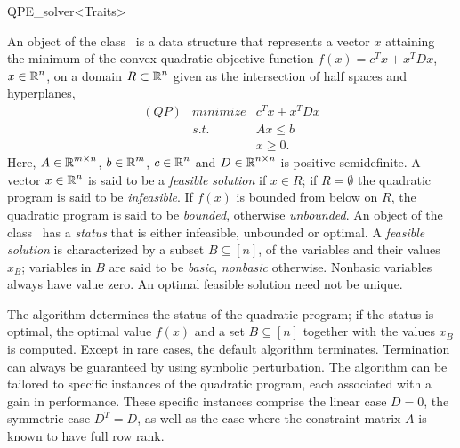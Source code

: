 
\begin{ccRefClass}{QPE_solver<Traits>}

\ccDefinition
An object of the class \ccRefName\ is a data structure that
represents a vector $x$ attaining the minimum of the convex quadratic objective
function $f(x)=c^{T}x+x^{T}Dx$, $x \in \mbox{$\mathbb R$}^{n}$, on a domain $R \subset \mbox{$\mathbb R$}^{n}$
given as the intersection of half spaces and hyperplanes,
\begin{eqnarray*}
(QP)&minimize & c^{T}x+x^{T}Dx \\
&s.t.     & Ax \leq b \\
&& x \geq 0.
\end{eqnarray*}
Here, $A \in \mbox{$\mathbb R$}^{m \times n}$, $b \in \mbox{$\mathbb R$}^{m}$, $c \in \mbox{$\mathbb R$}^{n}$ and
$D \in \mbox{$\mathbb R$}^{n \times n}$ is positive-semidefinite.
A vector $x \in \mbox{$\mathbb R$}^{n}$ is said to be a \emph{feasible solution}
if $x \in R$; if $R=\emptyset$ the quadratic program is said to be
\emph{infeasible}. If $f(x)$ is bounded from
below on $R$, the quadratic program is said to be \emph{bounded}, otherwise
\emph{unbounded}. An object of the class \ccRefName\ has a \emph{status} that
is either infeasible, unbounded or optimal.  
A \emph{feasible solution} is characterized by a
subset $B\subseteq\left[n\right]$, of the variables
and their values $x_{B}$;
variables in $B$ are said to be \emph{basic}, \emph{nonbasic} otherwise. 
Nonbasic variables always have value zero. An optimal feasible solution
need not be unique.

The algorithm determines the status of the quadratic program; if the status is
optimal, the optimal value $f(x)$ and a set $B \subseteq \left[n\right]$
together with the values $x_{B}$ is computed. Except in rare
cases, the default algorithm terminates. Termination can always be guaranteed
by using symbolic perturbation. The algorithm can be tailored to specific
instances of the quadratic program, each associated with a gain in performance.
These specific
instances comprise the linear case $D=0$, the symmetric case $D^{T}=D$, as
well as the case where the constraint matrix $A$ is known to have full row rank.   


\end{ccRefClass}
